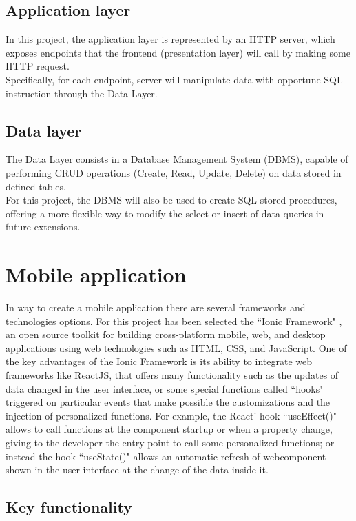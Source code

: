 \documentclass[conference]{IEEEtran}
\begin{document}
\subsection{Application layer}

In this project, the application layer is represented by an HTTP server, which exposes endpoints that the frontend (presentation layer) will call by making some HTTP request.
\\
Specifically, for each endpoint, server will manipulate data with opportune SQL instruction through the Data Layer.

\subsection{Data layer}

The Data Layer consists in a Database Management System (DBMS), capable of performing CRUD operations (Create, Read, Update, Delete) on data stored in defined tables.
\\
For this project, the DBMS will also be used to create SQL stored procedures, offering a more flexible way to modify the select or insert of data queries in future extensions.


\section{Mobile application}
In way to create a mobile application there are several frameworks and technologies options. For this project has been selected the ``Ionic Framework" \cite{b1}, an open source toolkit for building cross-platform mobile, web, and desktop applications using web technologies such as HTML, CSS, and JavaScript.
One of the key advantages of the Ionic Framework is its ability to integrate web frameworks like ReactJS, that offers many functionality such as the updates of data changed in the user interface, or some special functions called ``hooks" triggered on particular events that make possible the customizations and the injection of personalized functions.
For example, the React' hook ``useEffect()" allows to call functions at the component startup or when a property change, giving to the developer the entry point to call some personalized functions; or instead the hook ``useState()" allows an automatic refresh of webcomponent shown in the user interface at the change of the data inside it.



\subsection{Key functionality}
\end{document}
